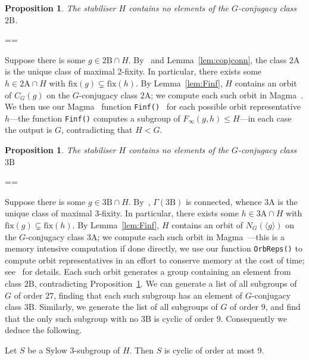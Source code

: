 \documentclass[11pt, a4paper]{amsart}
\makeatletter
\newcommand\fix{\mathrm{fix}}
\newcommand{\magma}{{\sc Magma}}
\newtheorem{prop}[thm]{Proposition}
\renewcommand{\proofname}{Proof}
\renewenvironment{proof}[1][\proofname]{\par
  \pushQED{\qed}  \normalfont \partopsep=\z@skip \topsep=\z@skip
  \trivlist
  \item[\hskip\labelsep
        \scshape
    #1\@addpunct{.}]\ignorespaces
}{  \popQED\endtrivlist\@endpefalse
}
\makeatother
\begin{document}
  \begin{prop}\label{prop:Co2no2B}
        The stabiliser $H$ contains no elements of the $G$-conjugacy class $\mathrm{2B}$.
\end{prop}
\begin{proof}
    Suppose there is some $g\in \mathrm{2B}\cap H$. By~\cite[Propositions 3.1, 3.2, and 3.3]{CDP} and Lemma~\ref{lem:conjconn}, the class $\mathrm{2A}$ is the unique class of maximal 2-fixity. In particular, there exists some $h\in\mathrm{2A}\cap H$ with $\fix(g)\subsetneq \fix(h)$. By Lemma~\ref{lem:Finf}, $H$ contains an orbit of $C_G( g)$ on the $G$-conjugacy class $\mathrm{2A}$; we compute each such orbit in \magma~\cite{magma}. We then use our \magma~ function {\tt{Finf()}}~\cite{comps} for each possible orbit representative $h$---the function {\tt{Finf()}} computes a subgroup of $F_\infty(g,h)\leq H$---in each case the output is $G$, contradicting that $H<G$.
\end{proof}

\begin{prop}\label{prop:Co2no3B}
        The stabiliser $H$ contains no elements of the $G$-conjugacy class $\mathrm{3B}$
\end{prop}
\begin{proof}
    Suppose there is some $g\in \mathrm{3B}\cap H$. By~\cite[Proposition 3.1, 3.2, and 3.3]{CDP}, $\Gamma(\mathrm{3B})$ is connected, whence $\mathrm{3A}$ is the unique class of maximal 3-fixity. In particular, there exists some $h\in\mathrm{3A}\cap H$ with $\fix(g)\subsetneq \fix(h)$. By Lemma~\ref{lem:Finf}, $H$ contains an orbit of $N_G(\langle g\rangle)$ on the $G$-conjugacy class $\mathrm{3A}$; we compute each such orbit in \magma~\cite{magma}---this is a memory intensive computation if done directly, we use our function {\tt OrbReps()} to compute orbit representatives in an effort to conserve memory at the cost of time; see~\cite{comps} for details. Each such orbit generates a group containing an element from class $\mathrm{2B}$, contradicting Proposition~\ref{prop:Co2no2B}.
\end{proof}
We can generate a list of all subgroups of $G$ of order $27$, finding that each such subgroup has an element of $G$-conjugacy class $\mathrm{3B}$. Similarly, we generate the list of all subgroups of $G$ of order $9$, and find that the only such subgroup with no $\mathrm{3B}$ is cyclic of order $9$. Consequently we deduce the following.

\begin{cor}\label{cor:Co2cycsyl}
    Let $S$ be a Sylow 3-subgroup of $H$. Then $S$ is cyclic of order at most 9.
\end{cor}
\end{document}
